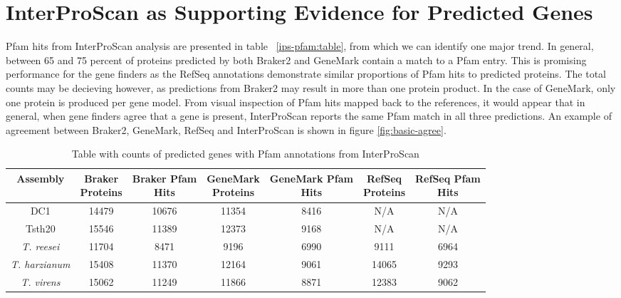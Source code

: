 \section{InterProScan as Supporting Evidence for Predicted Genes}

Pfam hits from InterProScan analysis are presented in table
~\ref{ips-pfam:table}, from which we can identify one major trend. In
general, between 65 and 75 percent of proteins predicted by both
Braker2 and GeneMark contain a match to a Pfam entry. This is
promising performance for the gene finders as the RefSeq annotations
demonstrate similar proportions of Pfam hits to predicted
proteins. The total counts may be decieving however, as predictions
from Braker2 may result in more than one protein product. In the case
of GeneMark, only one protein is produced per gene model. From visual
inspection of Pfam hits mapped back to the references, it would appear
that in general, when gene finders agree that a gene is present,
InterProScan reports the same Pfam match in all three predictions. An
example of agreement between Braker2, GeneMark, RefSeq and
InterProScan is shown in figure \ref{fig:basic-agree}. 

\begin{table}[!]
  \centering
  \begin{tabular}{|c|c|c|c|c|c|c|}
    \hline
    Assembly & \makecell{Braker \\ Proteins} & \makecell{Braker Pfam \\ Hits} & \makecell{GeneMark \\ Proteins} & \makecell{GeneMark Pfam \\Hits} & \makecell{RefSeq \\ Proteins} & \makecell{RefSeq Pfam \\ Hits}  \\ \hline
    DC1 & 14479 & 10676 & 11354 & 8416  & N/A & N/A \\ \hline
    Tsth20 & 15546 & 11389 & 12373 & 9168 & N/A & N/A \\ \hline
    \textit{T. reesei} & 11704 & 8471 & 9196 & 6990 & 9111 & 6964 \\ \hline
    \textit{T. harzianum} & 15408 & 11370 & 12164 & 9061 & 14065 & 9293 \\ \hline
    \textit{T. virens} & 15062 & 11249 & 11866 & 8871 & 12383 & 9062 \\ \hline
  \end{tabular}
  \caption[InterProScan Pfam Evidence]{Table with counts of predicted
    genes with Pfam annotations from InterProScan}
  \label{table:regioncounts}
\end{table}


